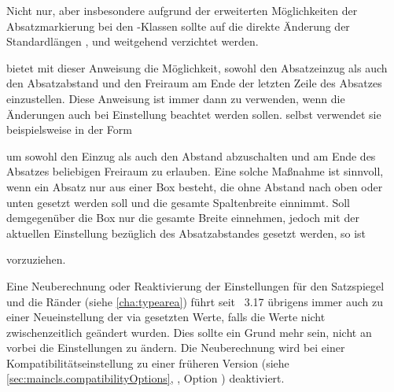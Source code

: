 Nicht nur, aber insbesondere aufgrund der erweiterten Möglichkeiten der
Absatzmarkierung bei den \KOMAScript-Klassen sollte auf die direkte Änderung
der Standardlängen ,
 und
 weitgehend verzichtet werden.

\begin{Declaration}
\end{Declaration}
\KOMAScript{} bietet mit dieser Anweisung die Möglichkeit, sowohl den
Absatzeinzug als auch den Absatzabstand und den Freiraum am Ende der letzten
Zeile des Absatzes einzustellen. Diese Anweisung ist immer dann zu verwenden,
wenn die Änderungen auch bei Einstellung
 beachtet werden
sollen. \KOMAScript{} selbst verwendet sie beispielsweise
in der Form
\begin{lstcode}
\end{lstcode}
um sowohl den Einzug als auch den Abstand abzuschalten und am Ende des
Absatzes beliebigen Freiraum zu erlauben. Eine solche Maßnahme ist sinnvoll,
wenn ein Absatz nur aus einer Box besteht, die ohne Abstand nach oben oder
unten gesetzt werden soll und die gesamte Spaltenbreite einnimmt. Soll
demgegenüber die Box nur die gesamte Breite einnehmen, jedoch mit der
aktuellen Einstellung bezüglich des Absatzabstandes gesetzt werden, so ist
\begin{lstcode}
  \setlength{\parfillskip}{0pt plus 1fil}
\end{lstcode}
vorzuziehen.

Eine Neuberechnung oder Reaktivierung
der Einstellungen für den Satzspiegel und die Ränder (siehe
\autoref{cha:typearea}) führt seit \KOMAScript~3.17 übrigens immer auch zu
einer Neueinstellung der via  gesetzten Werte, falls die
Werte nicht zwischenzeitlich geändert wurden. Dies sollte ein Grund mehr sein,
nicht an \KOMAScript{} vorbei die Einstellungen zu ändern. Die Neuberechnung
wird bei einer Kompatibilitätseinstellung zu einer früheren Version (siehe
\autoref{sec:maincls.compatibilityOptions},
, Option
%
)
deaktiviert.%
%
\EndIndexGroup

